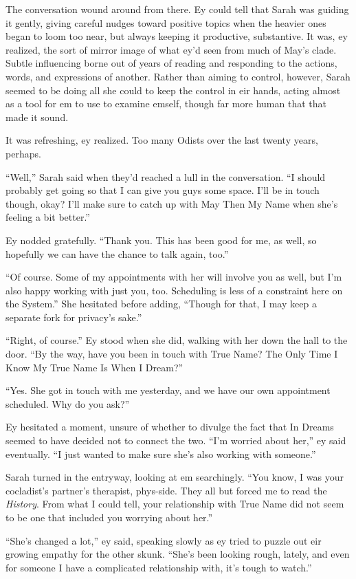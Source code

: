 The conversation wound around from there. Ey could tell that Sarah was guiding it gently, giving careful nudges toward positive topics when the heavier ones began to loom too near, but always keeping it productive, substantive. It was, ey realized, the sort of mirror image of what ey'd seen from much of May's clade. Subtle influencing borne out of years of reading and responding to the actions, words, and expressions of another. Rather than aiming to control, however, Sarah seemed to be doing all she could to keep the control in eir hands, acting almost as a tool for em to use to examine emself, though far more human that that made it sound.

It was refreshing, ey realized. Too many Odists over the last twenty years, perhaps.

``Well,'' Sarah said when they'd reached a lull in the conversation. ``I should probably get going so that I can give you guys some space. I'll be in touch though, okay? I'll make sure to catch up with May Then My Name when she's feeling a bit better.''

Ey nodded gratefully. ``Thank you. This has been good for me, as well, so hopefully we can have the chance to talk again, too.''

``Of course. Some of my appointments with her will involve you as well, but I'm also happy working with just you, too. Scheduling is less of a constraint here on the System.'' She hesitated before adding, ``Though for that, I may keep a separate fork for privacy's sake.''

``Right, of course.'' Ey stood when she did, walking with her down the hall to the door. ``By the way, have you been in touch with True Name? The Only Time I Know My True Name Is When I Dream?''

``Yes. She got in touch with me yesterday, and we have our own appointment scheduled. Why do you ask?''

Ey hesitated a moment, unsure of whether to divulge the fact that In Dreams seemed to have decided not to connect the two. ``I'm worried about her,'' ey said eventually. ``I just wanted to make sure she's also working with someone.''

Sarah turned in the entryway, looking at em searchingly. ``You know, I was your cocladist's partner's therapist, phys-side. They all but forced me to read the \emph{History}. From what I could tell, your relationship with True Name did not seem to be one that included you worrying about her.''

``She's changed a lot,'' ey said, speaking slowly as ey tried to puzzle out eir growing empathy for the other skunk. ``She's been looking rough, lately, and even for someone I have a complicated relationship with, it's tough to watch.''

